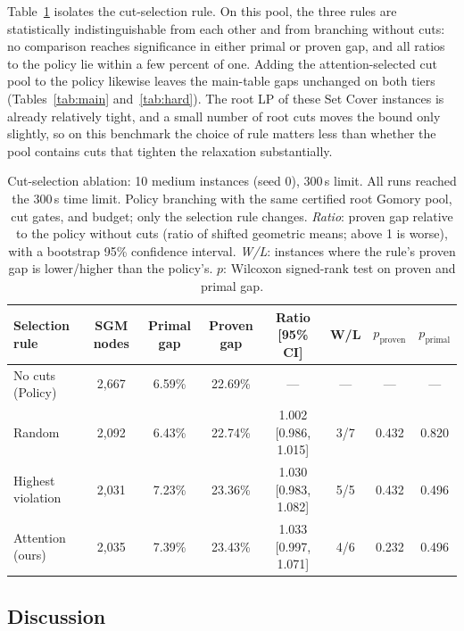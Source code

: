 \documentclass[11pt,a4paper]{article}
\begin{document}
Table~\ref{tab:cuts} isolates the cut-selection rule. On this pool, the three rules are statistically indistinguishable from each other and from branching without cuts: no comparison reaches significance in either primal or proven gap, and all ratios to the policy lie within a few percent of one. Adding the attention-selected cut pool to the policy likewise leaves the main-table gaps unchanged on both tiers (Tables~\ref{tab:main} and~\ref{tab:hard}). The root LP of these Set Cover instances is already relatively tight, and a small number of root cuts moves the bound only slightly, so on this benchmark the choice of rule matters less than whether the pool contains cuts that tighten the relaxation substantially.

\begin{table}[t]
\caption{Cut-selection ablation: 10 medium instances (seed 0), 300\,s limit. All runs reached the 300\,s time limit. Policy branching with the same certified root Gomory pool, cut gates, and budget; only the selection rule changes. \emph{Ratio}: proven gap relative to the policy without cuts (ratio of shifted geometric means; above 1 is worse), with a bootstrap 95\% confidence interval. \emph{W/L}: instances where the rule's proven gap is lower/higher than the policy's. $p$: Wilcoxon signed-rank test on proven and primal gap.}
\label{tab:cuts}
\begin{center}
\small
\setlength{\tabcolsep}{4pt}
\begin{tabular}{lccccccc}
\toprule
Selection rule & SGM nodes & Primal gap & Proven gap & Ratio [95\% CI] & W/L & $p_{\text{proven}}$ & $p_{\text{primal}}$ \\
\midrule
No cuts (Policy)   & 2{,}667 & 6.59\% & 22.69\% & ---                  & ---  & ---   & ---   \\
Random             & 2{,}092 & 6.43\% & 22.74\% & 1.002 [0.986, 1.015] & 3/7  & 0.432 & 0.820 \\
Highest violation  & 2{,}031 & 7.23\% & 23.36\% & 1.030 [0.983, 1.082] & 5/5  & 0.432 & 0.496 \\
Attention (ours)   & 2{,}035 & 7.39\% & 23.43\% & 1.033 [0.997, 1.071] & 4/6  & 0.232 & 0.496 \\
\bottomrule
\end{tabular}
\end{center}
\end{table}

\subsection{Discussion}
\end{document}
